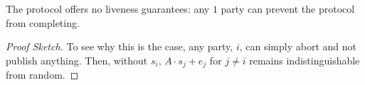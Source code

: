 





\begin{theorem}[Liveness]
	The protocol offers no liveness guarantees: any $1$ party can prevent the protocol from completing.
\end{theorem}
\begin{proof}[Proof Sketch]
	To see why this is the case, any party, $i$, can simply abort and not publish anything.
	Then, without $s_i$, $A \cdot s_j + e_j$ for $j \neq i$ remains indistinguishable from random.
\end{proof}


